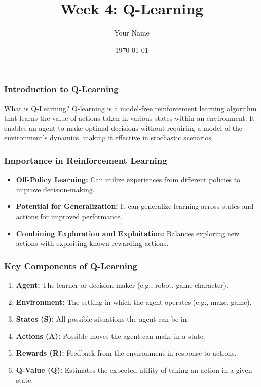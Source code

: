 \documentclass{beamer}
\title{Week 4: Q-Learning}
\author{Your Name}
\institute{Your Institution}
\date{\today}
\begin{document}
\frame{\titlepage}

\begin{frame}[fragile]
    \frametitle{Introduction to Q-Learning}
    \begin{block}{What is Q-Learning?}
        Q-learning is a model-free reinforcement learning algorithm that learns the value of actions taken in various states within an environment.
        It enables an agent to make optimal decisions without requiring a model of the environment's dynamics, making it effective in stochastic scenarios.
    \end{block}
\end{frame}

\begin{frame}[fragile]
    \frametitle{Importance in Reinforcement Learning}
    \begin{itemize}
        \item \textbf{Off-Policy Learning:} Can utilize experiences from different policies to improve decision-making.
        \item \textbf{Potential for Generalization:} It can generalize learning across states and actions for improved performance.
        \item \textbf{Combining Exploration and Exploitation:} Balances exploring new actions with exploiting known rewarding actions.
    \end{itemize}
\end{frame}

\begin{frame}[fragile]
    \frametitle{Key Components of Q-Learning}
    \begin{enumerate}
        \item \textbf{Agent:} The learner or decision-maker (e.g., robot, game character).
        \item \textbf{Environment:} The setting in which the agent operates (e.g., maze, game).
        \item \textbf{States (S):} All possible situations the agent can be in.
        \item \textbf{Actions (A):} Possible moves the agent can make in a state.
        \item \textbf{Rewards (R):} Feedback from the environment in response to actions.
        \item \textbf{Q-Value (Q):} Estimates the expected utility of taking an action in a given state.
    \end{enumerate}
\end{frame}
\end{document}
